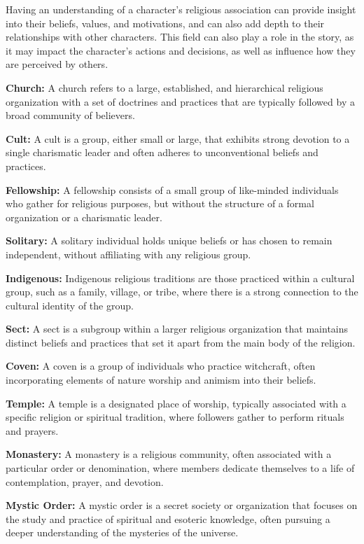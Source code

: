 Having an understanding of a character's religious association can provide insight into their beliefs, values, and motivations, and can also add depth to their relationships with other characters. This field can also play a role in the story, as it may impact the character's actions and decisions, as well as influence how they are perceived by others.

\textbf{Church:} A church refers to a large, established, and hierarchical religious organization with a set of doctrines and practices that are typically followed by a broad community of believers.

\textbf{Cult:} A cult is a group, either small or large, that exhibits strong devotion to a single charismatic leader and often adheres to unconventional beliefs and practices.

\textbf{Fellowship:} A fellowship consists of a small group of like-minded individuals who gather for religious purposes, but without the structure of a formal organization or a charismatic leader.

\textbf{Solitary:} A solitary individual holds unique beliefs or has chosen to remain independent, without affiliating with any religious group.

\textbf{Indigenous:} Indigenous religious traditions are those practiced within a cultural group, such as a family, village, or tribe, where there is a strong connection to the cultural identity of the group.

\textbf{Sect:} A sect is a subgroup within a larger religious organization that maintains distinct beliefs and practices that set it apart from the main body of the religion.

\textbf{Coven:} A coven is a group of individuals who practice witchcraft, often incorporating elements of nature worship and animism into their beliefs.

\textbf{Temple:} A temple is a designated place of worship, typically associated with a specific religion or spiritual tradition, where followers gather to perform rituals and prayers.

\textbf{Monastery:} A monastery is a religious community, often associated with a particular order or denomination, where members dedicate themselves to a life of contemplation, prayer, and devotion.

\textbf{Mystic Order:} A mystic order is a secret society or organization that focuses on the study and practice of spiritual and esoteric knowledge, often pursuing a deeper understanding of the mysteries of the universe.

